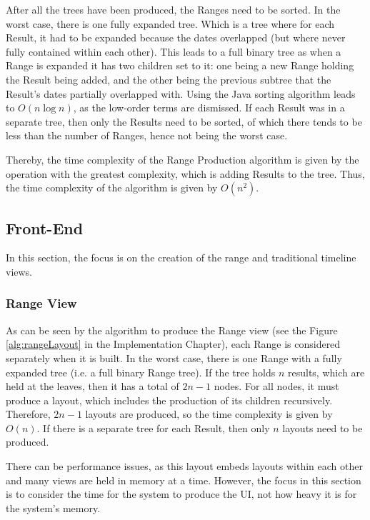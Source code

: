 \par After all the trees have been produced, the Ranges need to be sorted. In the worst case, there is one fully expanded tree. Which is a tree where for each Result, it had to be expanded because the dates overlapped (but where never fully contained within each other). This leads to a full binary tree as when a Range is expanded it has two children set to it: one being a new Range holding the Result being added, and the other being the previous subtree that the Result's dates partially overlapped with. Using the Java sorting algorithm leads to $O(n\log n)$, as the low-order terms are dismissed. If each Result was in a separate tree, then only the Results need to be sorted, of which there tends to be less than the number of Ranges, hence not being the worst case.

\par Thereby, the time complexity of the Range Production algorithm is given by the operation with the greatest complexity, which is adding Results to the tree. Thus, the time complexity of the algorithm is given by $O(n^2)$.

\subsection{Front-End}
\par In this section, the focus is on the creation of the range and traditional timeline views.
\subsubsection{Range View}
\par As can be seen by the algorithm to produce the Range view (see the Figure \ref{alg:rangeLayout} in the Implementation Chapter), each Range is considered separately when it is built. In the worst case, there is one Range with a fully expanded tree (i.e. a full binary Range tree). If the tree holds $n$ results, which are held at the leaves, then it has a total of $2n-1$ nodes. For all nodes, it must produce a layout, which includes the production of its children recursively. Therefore, $2n-1$ layouts are produced, so the time complexity is given by $O(n)$.  If there is a separate tree for each Result, then only $n$ layouts need to be produced.

\par There can be performance issues, as this layout embeds layouts within each other and many views are held in memory at a time. However, the focus in this section is to consider the time for the system to produce the UI, not how heavy it is for the system's memory.

